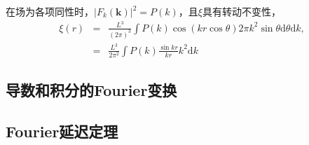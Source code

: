 \documentclass[12pt,a4paper]{article}
\renewcommand{\vec}[1]{\boldsymbol{#1}}
\newcommand{\dif}{\mathrm{d}}
\begin{document}
在场为各项同性时，$|F_k(\vec{k})|^2 = P(k)$，且$\xi$具有转动不变性，
\begin{eqnarray}
\nonumber \xi(r) &=& \frac{L^3}{(2\pi)^3} \int P(k) \cos(kr \cos \theta) 2\pi k^2 \sin \theta \dif \theta \dif k, \\
&=& \frac{L^3}{2\pi^2} \int P(k) \frac{\sin kr}{kr} k^2 \dif k
\end{eqnarray}

\subsection{导数和积分的Fourier变换}




\subsection{Fourier延迟定理}
\end{document}

